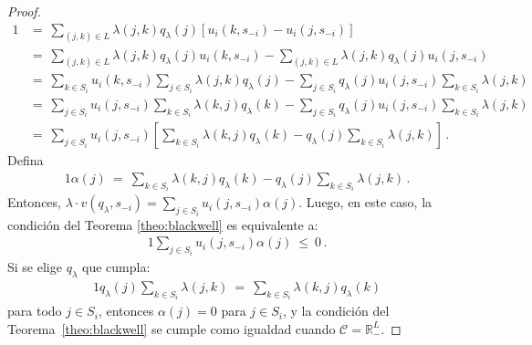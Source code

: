 \begin{proof}
\begin{alignat}{1}
	&=\ \sum_{(j,k) \in L} \lambda(j, k) q_{\lambda}(j) [u_i(k, s_{-i}) - u_i(j, s_{-i})] \\
	&=\ \sum_{(j,k) \in L} \lambda(j, k) q_{\lambda}(j)u_i(k, s_{-i}) - \sum_{(j,k) \in L} \lambda(j, k) q_{\lambda}(j)u_i(j, s_{-i}) \\
	&=\ \sum_{k \in S_i} u_i(k, s_{-i}) \sum_{j \in S_i} \lambda(j, k) q_{\lambda}(j) - \sum_{j \in S_i} q_{\lambda}(j)u_i(j, s_{-i}) \sum_{k \in S_i} \lambda(j, k) \\
	&=\ \sum_{j \in S_i} u_i(j, s_{-i}) \sum_{k \in S_i} \lambda(k, j) q_{\lambda}(k) - \sum_{j \in S_i} q_{\lambda}(j)u_i(j, s_{-i}) \sum_{k \in S_i} \lambda(j, k) \\
	&=\ \sum_{j \in S_i} u_i(j, s_{-i}) \left[ \sum_{k \in S_i} \lambda(k, j) q_{\lambda}(k) - q_{\lambda}(j) \sum_{k \in S_i} \lambda(j, k) \right] \,.
\end{alignat}
Defina
\begin{alignat}{1}
  \alpha(j)\ =\ \sum_{k \in S_i} \lambda(k, j) q_{\lambda}(k) - q_{\lambda}(j) \sum_{k \in S_i} \lambda(j, k) \,.
\end{alignat}
Entonces, $\lambda \cdot v(q_{\lambda}, s_{-i}) = \sum_{j \in S_i} u_i(j, s_{-i}) \alpha(j)$.
Luego, en este caso, la condición del Teorema \ref{theo:blackwell} es equivalente a:
\begin{alignat}{1}
	\sum_{j \in S_i} u_i(j, s_{-i}) \alpha(j)\ \leq\ 0 \,.
\end{alignat}
Si se elige $q_{\lambda}$ que cumpla:
\begin{alignat}{1}
  q_{\lambda}(j) \sum_{k \in S_i} \lambda(j, k)\ =\ \sum_{k \in S_i} \lambda(k, j) q_{\lambda}(k)
\end{alignat}
para todo $j \in S_i$, entonces $\alpha(j)=0$ para $j\in S_i$, y la condición del Teorema~\ref{theo:blackwell} se cumple como igualdad cuando $\mathcal{C} = \mathbb{R}^{L}_-$.


\end{proof}
